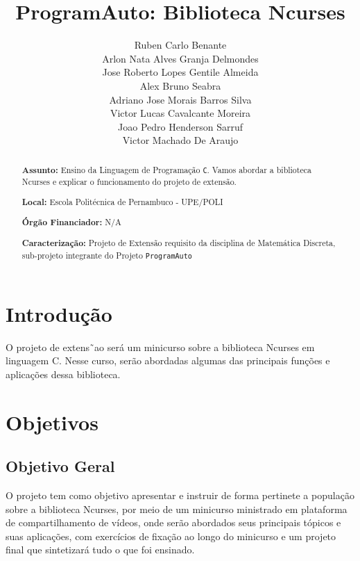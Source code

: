 \documentclass[a4paper,10pt]{article} %
\title{ProgramAuto: Biblioteca Ncurses}
\author{Ruben Carlo Benante \\ Arlon Nata Alves Granja Delmondes \\ Jose Roberto Lopes Gentile Almeida \\ Alex Bruno Seabra \\ Adriano Jose Morais Barros Silva \\ Victor Lucas Cavalcante Moreira \\ Joao Pedro Henderson Sarruf \\ Victor Machado De Araujo}
\begin{document}
\maketitle

\begin{abstract}

\textbf{Assunto:} Ensino da Linguagem de Programação \texttt{C}.
Vamos abordar a biblioteca Ncurses e explicar o funcionamento do projeto de extensão.



\textbf{Local:} Escola Politécnica de Pernambuco - UPE/POLI

\textbf{Órgão Financiador:} N/A

\textbf{Caracterização:} Projeto de Extensão requisito da disciplina de Matemática Discreta, sub-projeto integrante do Projeto \texttt{ProgramAuto}


\end{abstract}


\section{Introdução}

O  projeto de extens˜ao será um minicurso sobre a biblioteca Ncurses em linguagem C. Nesse curso, serão abordadas algumas das principais funções e aplicações dessa biblioteca.

\section{Objetivos}

\subsection{Objetivo Geral}
O projeto tem como objetivo apresentar e instruir de forma pertinete a população sobre a biblioteca Ncurses, por meio de um minicurso ministrado em plataforma de compartilhamento de vídeos, onde serão abordados seus principais tópicos e suas aplicações, com exercícios de fixação ao longo do minicurso e um projeto final que sintetizará tudo o que foi ensinado.
\end{document}
